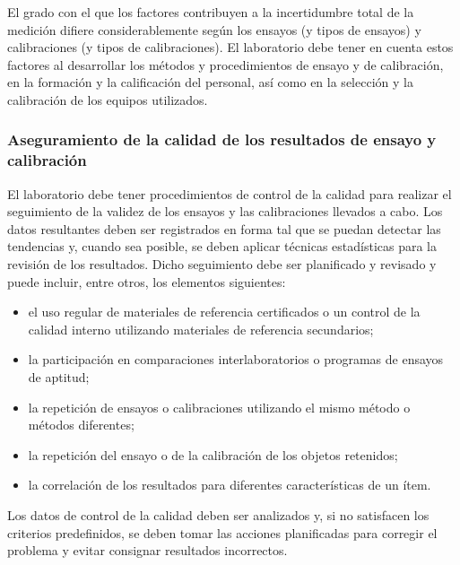 \par \noindent
El grado con el que los factores contribuyen a la incertidumbre total de la medición difiere
considerablemente según los ensayos (y tipos de ensayos) y calibraciones (y tipos de calibraciones). El
laboratorio debe tener en cuenta estos factores al desarrollar los métodos y procedimientos de ensayo y de
calibración, en la formación y la calificación del personal, así como en la selección y la calibración de los
equipos utilizados.

\subsubsection{Aseguramiento de la calidad de los resultados de ensayo y calibración}

\par 
El laboratorio debe tener procedimientos de control de la calidad para realizar el seguimiento de la
validez de los ensayos y las calibraciones llevados a cabo. Los datos resultantes deben ser registrados en
forma tal que se puedan detectar las tendencias y, cuando sea posible, se deben aplicar técnicas estadísticas
para la revisión de los resultados. Dicho seguimiento debe ser planificado y revisado y puede incluir, entre
otros, los elementos siguientes:\cite{iso17025}

\begin{itemize}
\item el uso regular de materiales de referencia certificados o un control de la calidad interno utilizando
materiales de referencia secundarios;

\item la participación en comparaciones interlaboratorios o programas de ensayos de aptitud;

\item la repetición de ensayos o calibraciones utilizando el mismo método o métodos diferentes;

\item la repetición del ensayo o de la calibración de los objetos retenidos;

\item la correlación de los resultados para diferentes características de un ítem.
\end{itemize}

\par \noindent
Los datos de control de la calidad deben ser analizados y, si no satisfacen los criterios predefinidos,
se deben tomar las acciones planificadas para corregir el problema y evitar consignar resultados incorrectos.

